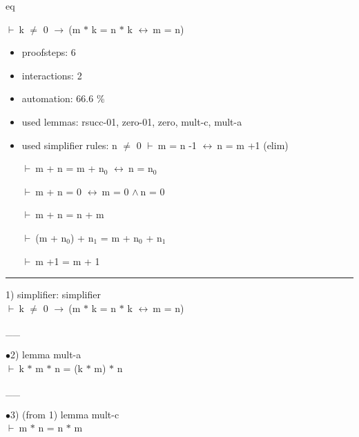 \documentclass[a4paper]{article}
\newcommand{\Fol}{\mbox{$\vdash\ $}}
\newcommand{\And}{\mbox{$\wedge\ $}}
\newcommand{\Imp}{\mbox{$\rightarrow\ $}}
\newcommand{\Equiv}{\mbox{$\leftrightarrow\ $}}
\begin{document}
\raggedright
              



\begin{minipage}{\textwidth}
\begin{center}

\end{center}
\end{minipage}

\vspace{5ex}

{\Huge eq}

\vspace{5ex}

 \Fol k $\neq$ 0 \Imp (m $*$ k = n $*$ k \Equiv m = n)

\begin{itemize}
\item proofsteps: 6
\item interactions: 2
\item automation: 66.6 \%
\item used lemmas: rsucc-01, zero-01, zero, mult-c, mult-a 
\item used simplifier rules:
n $\neq$ 0 \Fol m = n -1 \Equiv n = m +1 (elim)

 \Fol m + n = m + $\mbox{n}_{0}$ \Equiv n = $\mbox{n}_{0}$

 \Fol m + n = 0 \Equiv m = 0 \And n = 0

 \Fol m + n = n + m

 \Fol (m + $\mbox{n}_{0}$) + $\mbox{n}_{1}$ = m + $\mbox{n}_{0}$ + $\mbox{n}_{1}$

 \Fol m +1 = m + 1



               \end{itemize}



\vspace{3ex}\rule{1\textwidth}{1mm}


1) simplifier: simplifier \\
 \Fol k $\neq$ 0 \Imp (m $*$ k = n $*$ k \Equiv m = n)

\vspace{-1.5ex}\_\hrulefill \_

$\bullet$2) lemma mult-a \\
 \Fol k $*$ m $*$ n = (k $*$ m) $*$ n

\vspace{-1.5ex}\_\hrulefill \_

$\bullet$3)  (from 1) lemma mult-c \\
 \Fol m $*$ n = n $*$ m
\end{document}
